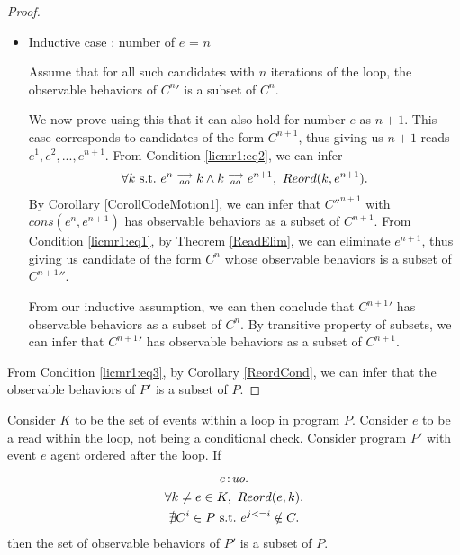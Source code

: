 \begin{proof}
\begin{itemize}
        \item Inductive case : number of $e$ = $n$

        Assume that for all such candidates with $n$ iterations of the loop, the observable behaviors of $C^n'$ is a subset of $C^n$.

        We now prove using this that it can also hold for number $e$ as $n + 1$. 
        This case corresponds to candidates of the form $C^{n+1}$, thus giving us $n+1$ reads $e^1, e^2,...,e^{n+1}$.
        From Condition \ref{licmr1:eq2}, we can infer 
        \begin{align*}
            \forall k \ \text{s.t.} \ e^n\stackrel{\longrightarrow}{_{ao}}k \wedge k\stackrel{\longrightarrow}{_{ao}}e^{n+1}, \ Reord(k,e^{n+1}).
        \end{align*}
        By Corollary \ref{CorollCodeMotion1}, we can infer that $C''^{n+1}$ with $cons(e^n, e^{n+1})$ has observable behaviors as a subset of $C^{n+1}$. 
        From Condition \ref{licmr1:eq1}, by Theorem \ref{ReadElim}, we can eliminate $e^{n+1}$, thus giving us candidate of the form $C^n$ whose observable behaviors is a subset of $C^{n+1}''$.

        From our inductive assumption, we can then conclude that $C^{n+1}'$ has observable behaviors as a subset of $C^n$. 
        By transitive property of subsets, we can infer that $C^{n+1}'$ has observable behaviors as a subset of $C^{n+1}$.

    \end{itemize}

    From Condition \ref{licmr1:eq3}, by Corollary \ref{ReordCond}, we can infer that the observable behaviors of $P'$ is a subset of $P$.
    
\end{proof}


\begin{corollary}
    \label{LoopInvCodeMotRead2}
    Consider $K$ to be the set of events within a loop in program $P$. 
    Consider $e$ to be a read within the loop, not being a conditional check. 
    Consider program $P'$ with event $e$ agent ordered after the loop. 
    If
    \begin{gather}
        e\!:\!\textit{uo}. \label{licmr2:eq1}\\
        \forall k \neq e \in K, \ Reord(e, k). \label{licmr2:eq2}\\ 
        \nexists C^i \in P \ \text{s.t.} \ e^{j<=i} \notin C.  \label{licmr2:eq3}                    
    \end{gather}
    then the set of observable behaviors of $P'$ is a subset of $P$.
\end{corollary}

